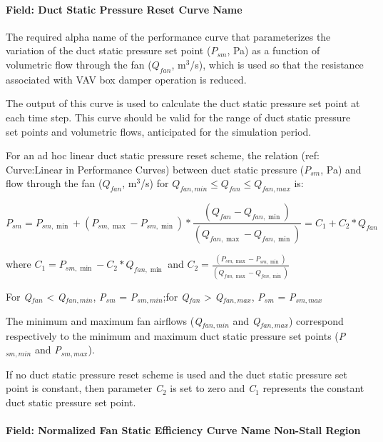 \paragraph{Field: Duct Static Pressure Reset Curve Name}\label{field-duct-static-pressure-reset-curve-name}

The required alpha name of the performance curve that parameterizes the variation of the duct static pressure set point (\(P_{sm}\), Pa) as a function of volumetric flow through the fan (\(Q_{fan}\), m\(^{3}\)/s), which is used so that the resistance associated with VAV box damper operation is reduced.

The output of this curve is used to calculate the duct static pressure set point at each time step. This curve should be valid for the range of duct static pressure set points and volumetric flows, anticipated for the simulation period.

For an ad hoc linear duct static pressure reset scheme, the relation (ref: Curve:Linear in Performance Curves) between duct static pressure (\(P_{sm}\), Pa) and flow through the fan (\(Q_{fan}\), m\(^{3}\)/s) for \(Q_{fan,min} \le Q_{fan} \le Q_{fan,max}\) is:

\begin{equation}
P_{sm} = P_{sm,\min } + \left( P_{sm,\max } - P_{sm,\min } \right) * \frac{{\left( {{Q_{fan}} - {Q_{fan,\min }}} \right)}}{{\left( {{Q_{fan,\max }} - {Q_{fan,\min }}} \right)}} = {C_1} + {C_2}*{Q_{fan}}
\end{equation}

where \({C_1} = {P_{sm,\min }} - {C_2}*{Q_{fan,\min }}\) and \({C_2} = \frac{{\left( {{P_{sm,\max }} - {P_{sm,\min }}} \right)}}{{\left( {{Q_{fan,\max }} - {Q_{fan,\min }}} \right)}}\)

For \emph{Q\(_{fan}\)} \textless{} \emph{Q\(_{fan,min}\)}, \emph{P\(_{sm}\)} = \emph{P\(_{sm,min}\)};for \emph{Q\(_{fan}\)} \textgreater{} \emph{Q\(_{fan,max}\)}, \emph{P\(_{sm}\)} = \emph{P\(_{sm,max}\)}

The minimum and maximum fan airflows (\emph{Q\(_{fan,min}\)} and \emph{Q\(_{fan,max}\)}) correspond respectively to the minimum and maximum duct static pressure set points (\emph{P\(_{sm,min}\)} and \emph{P\(_{sm,max}\)}).

If no duct static pressure reset scheme is used and the duct static pressure set point is constant, then parameter \emph{C\(_{2}\)} is set to zero and \emph{C\(_{1}\)} represents the constant duct static pressure set point.

\paragraph{Field: Normalized Fan Static Efficiency Curve Name Non-Stall Region}\label{field-normalized-fan-static-efficiency-curve-name-non-stall-region}

